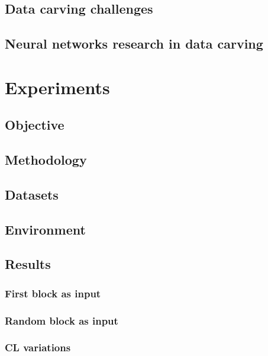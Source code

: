     \subsection{Data carving challenges}
    
    \subsection{Neural networks research in data carving}
    


\section{\label{chap:experiments}Experiments}

    \subsection{Objective}
    
    \subsection{Methodology}
    
    \subsection{Datasets}
    
    \subsection{Environment}
    
    \subsection{Results}
    
        \subsubsection{First block as input}
        
        \subsubsection{Random block as input}
        
        \subsubsection{CL variations}
        
